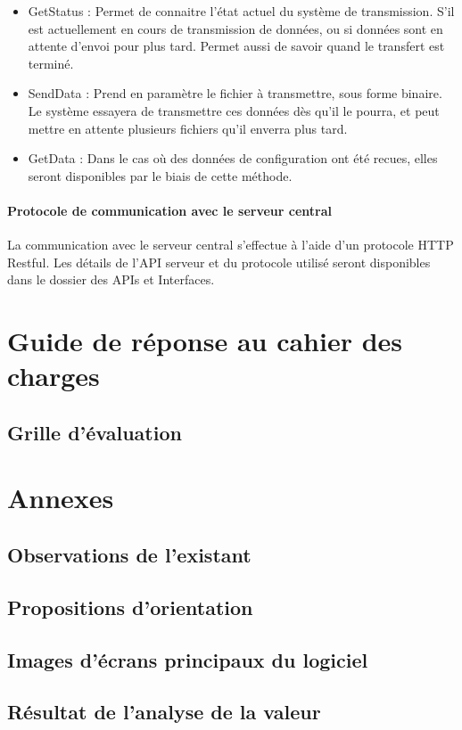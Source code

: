 \begin{itemize}
\item GetStatus : Permet de connaitre l'état actuel du système de transmission. S'il est actuellement en cours de transmission de données, ou si données sont en attente d'envoi pour plus tard. Permet aussi de savoir quand le transfert est terminé.
\item SendData : Prend en paramètre le fichier à transmettre, sous forme binaire. Le système essayera de transmettre ces données dès qu'il le pourra, et peut mettre en attente plusieurs fichiers qu'il enverra plus tard.
\item GetData : Dans le cas où des données de configuration ont été recues, elles seront disponibles par le biais de cette méthode.
\end{itemize}

\paragraph{Protocole de communication avec le serveur central}

La communication avec le serveur central s'effectue à l'aide d'un protocole HTTP Restful\footnotemark. Les détails de l'API serveur et du protocole utilisé seront disponibles dans le dossier des APIs et Interfaces.


\section{Guide de réponse au cahier des charges}

\subsection{Grille d'évaluation}

\section{Annexes}

\subsection{Observations de l'existant}

\subsection{Propositions d'orientation}

\subsection{Images d'écrans principaux du logiciel}

\subsection{Résultat de l'analyse de la valeur}